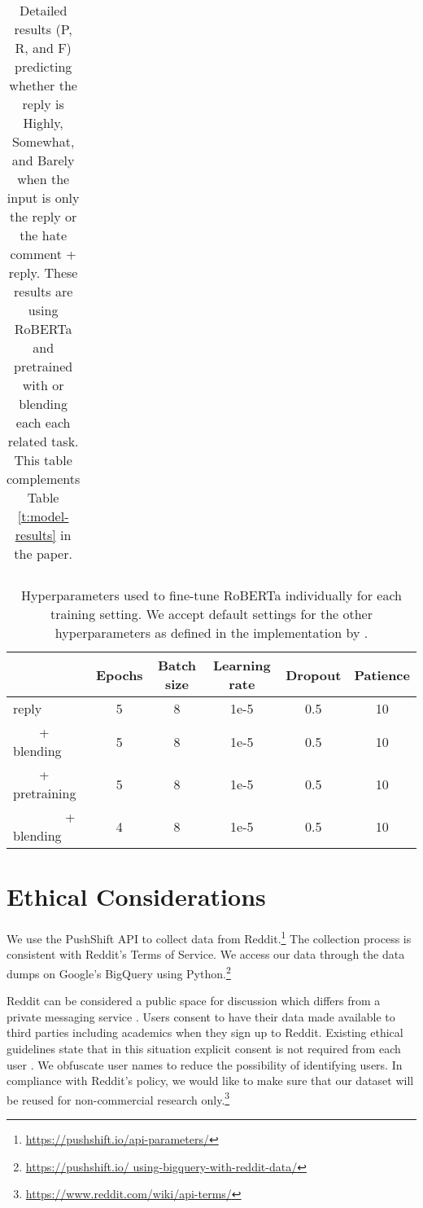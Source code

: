 \documentclass[11pt]{article}
\begin{document}
\begin{table*}
\begin{tabular}{l ccc ccc ccc ccc}
		\end{tabular}
		\caption{Detailed results (P, R, and F) predicting whether the reply is Highly, Somewhat, and Barely when the input is only the reply or the hate comment + reply. These results are using RoBERTa and pretrained with or blending each each related task. This table complements Table \ref{t:model-results} in the paper.}
		\label{t:detailed-results}
	\end{table*}
	
	\begin{table*}
		\centering
		\small
		\begin{tabular}{lccccc}
			\toprule
			& Epochs & Batch size & Learning rate & Dropout & Patience \\
			\midrule
			reply &  5 & 8 & 1e-5 & 0.5 & 10 \\
			~~~~+ blending & 5 & 8 &  1e-5 & 0.5 & 10 \\
			~~~~+ pretraining & 5 & 8 &  1e-5 & 0.5 & 10\\
			~~~~~~~~+ blending & 4 & 8 &  1e-5 & 0.5 & 10  \\
			\bottomrule
			
		\end{tabular}
		\caption{Hyperparameters used to fine-tune RoBERTa individually for each training setting. We accept default settings for the other hyperparameters as defined in the implementation by \citet{phang2020jiant}. }
		\label{t:hyperparameters}
	\end{table*}
	
	\section{Ethical Considerations}
	\label{sec:appendix}
	We use the PushShift API to collect data from Reddit.\footnote{\url{https://pushshift.io/api-parameters/}} 
	The collection process is consistent with Reddit's Terms of Service. 
	We access our data through the data dumps on Google's BigQuery using Python.\footnote{\url{https://pushshift.io/
			using-bigquery-with-reddit-data/}} 
	
	Reddit can be considered a public space for discussion which differs from a private messaging service \cite{vidgen-etal-2021-introducing}. 
	Users consent to have their data made available to third parties including academics when they sign up to Reddit. 
	Existing ethical guidelines state that in this situation explicit consent is not required from each user \cite{DBLP:conf/tto/ProcterWBHEWJ19}. 
	We obfuscate user names to reduce the possibility of identifying users. 
	In compliance with Reddit's policy, we would like to make sure that our dataset will be reused for non-commercial research only.\footnote{\url{https://www.reddit.com/wiki/api-terms/}}
	
\end{document}
